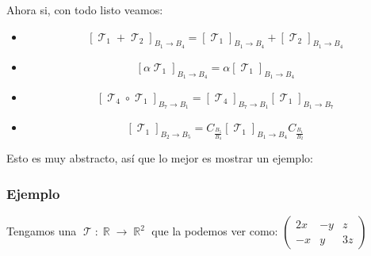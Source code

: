 \documentclass[12pt]{report}                                %
\DeclareMathOperator \Real {\mathbb{R}}
\DeclareMathOperator \LinealTransformation {\mathcal{T}}
\begin{document}
            Ahora si, con todo listo veamos:
            \begin{itemize}
                \item $$ [\LinealTransformation_1 + \LinealTransformation_2]_{B_1 \to B_4} = 
                            [\LinealTransformation_1]_{B_1 \to B_4}
                            +
                            [\LinealTransformation_2]_{B_1 \to B_4}
                        $$
                
                \item $$ [\alpha \LinealTransformation_1]_{B_1 \to B_4} = 
                            \alpha [\LinealTransformation_1]_{B_1 \to B_4}
                        $$

                \item $$ [\LinealTransformation_4 \circ \LinealTransformation_1]_{B_7 \to B_1} = 
                            [\LinealTransformation_4]_{B_7 \to B_1}
                            [\LinealTransformation_1]_{B_1 \to B_7}
                        $$

                \item $$ [\LinealTransformation_1]_{B_2 \to B_5} = 
                            C_{\frac{B_5}{B_4}}
                            [\LinealTransformation_1]_{B_1 \to B_4}
                            C_{\frac{B_1}{B_2}}
                        $$

            \end{itemize}


        Esto es muy abstracto, así que lo mejor es mostrar un ejemplo:


            \clearpage
            \subsubsection{Ejemplo}

            Tengamos una $\LinealTransformation : \Real \to \Real^2$  que la podemos ver como:
            $\begin{pmatrix} 2x&-y&z\\-x&y&3z\end{pmatrix}$
\end{document}
